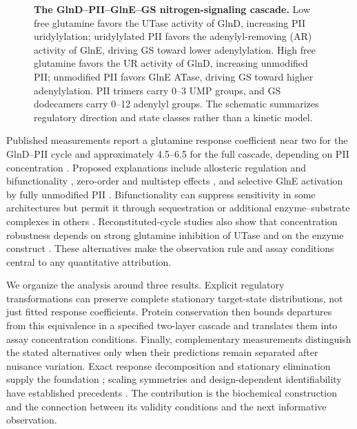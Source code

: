 \documentclass[10pt,letterpaper]{article}
\begin{document}
\begin{figure}[!ht]
\begin{singlespace}
\caption{\textbf{The GlnD--PII--GlnE--GS nitrogen-signaling cascade.} Low free glutamine favors the UTase activity of GlnD, increasing PII uridylylation; uridylylated PII favors the adenylyl-removing (AR) activity of GlnE, driving GS toward lower adenylylation. High free glutamine favors the UR activity of GlnD, increasing unmodified PII; unmodified PII favors GlnE ATase, driving GS toward higher adenylylation. PII trimers carry 0--3 UMP groups, and GS dodecamers carry 0--12 adenylyl groups. The schematic summarizes regulatory direction and state classes rather than a kinetic model.}
\end{singlespace}
\label{fig1}
\end{figure}

Published measurements report a glutamine response coefficient near two for the GlnD--PII cycle and approximately 4.5--6.5 for the full cascade, depending on PII concentration \cite{r12,r13}. Proposed explanations include allosteric regulation and bifunctionality \cite{r9,r10}, zero-order and multistep effects \cite{r13}, and selective GlnE activation by fully unmodified PII \cite{r12}. Bifunctionality can suppress sensitivity in some architectures but permit it through sequestration or additional enzyme--substrate complexes in others \cite{r40,r46,r66,r67}. Reconstituted-cycle studies also show that concentration robustness depends on strong glutamine inhibition of UTase and on the enzyme construct \cite{r36}. These alternatives make the observation rule and assay conditions central to any quantitative attribution.

We organize the analysis around three results. Explicit regulatory transformations can preserve complete stationary target-state distributions, not just fitted response coefficients. Protein conservation then bounds departures from this equivalence in a specified two-layer cascade and translates them into assay concentration conditions. Finally, complementary measurements distinguish the stated alternatives only when their predictions remain separated after nuisance variation. Exact response decomposition and stationary elimination supply the foundation \cite{r4,r22,r23,r24,r25,r26,r27,r46}; scaling symmetries and design-dependent identifiability have established precedents \cite{r70,r72,r73}. The contribution is the biochemical construction and the connection between its validity conditions and the next informative observation.
\end{document}
